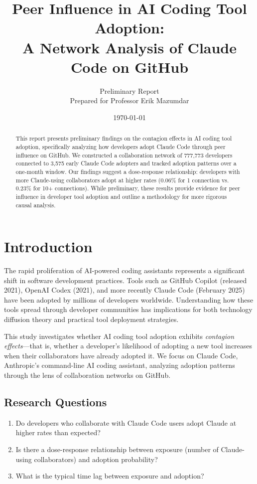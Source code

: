 \documentclass[11pt]{article}
\title{Peer Influence in AI Coding Tool Adoption:\\A Network Analysis of Claude Code on GitHub}
\author{Preliminary Report\\[1em]
\small Prepared for Professor Erik Mazumdar}
\date{\today}
\begin{document}
\maketitle

\begin{abstract}
This report presents preliminary findings on the contagion effects in AI coding tool adoption, specifically analyzing how developers adopt Claude Code through peer influence on GitHub. We constructed a collaboration network of 777,773 developers connected to 3,575 early Claude Code adopters and tracked adoption patterns over a one-month window. Our findings suggest a dose-response relationship: developers with more Claude-using collaborators adopt at higher rates (0.06\% for 1 connection vs. 0.23\% for 10+ connections). While preliminary, these results provide evidence for peer influence in developer tool adoption and outline a methodology for more rigorous causal analysis.
\end{abstract}

\section{Introduction}

The rapid proliferation of AI-powered coding assistants represents a significant shift in software development practices. Tools such as GitHub Copilot (released 2021), OpenAI Codex (2021), and more recently Claude Code (February 2025) have been adopted by millions of developers worldwide. Understanding how these tools spread through developer communities has implications for both technology diffusion theory and practical tool deployment strategies.

This study investigates whether AI coding tool adoption exhibits \textit{contagion effects}---that is, whether a developer's likelihood of adopting a new tool increases when their collaborators have already adopted it. We focus on Claude Code, Anthropic's command-line AI coding assistant, analyzing adoption patterns through the lens of collaboration networks on GitHub.

\subsection{Research Questions}

\begin{enumerate}
    \item Do developers who collaborate with Claude Code users adopt Claude at higher rates than expected?
    \item Is there a dose-response relationship between exposure (number of Claude-using collaborators) and adoption probability?
    \item What is the typical time lag between exposure and adoption?
\end{enumerate}
\end{document}
